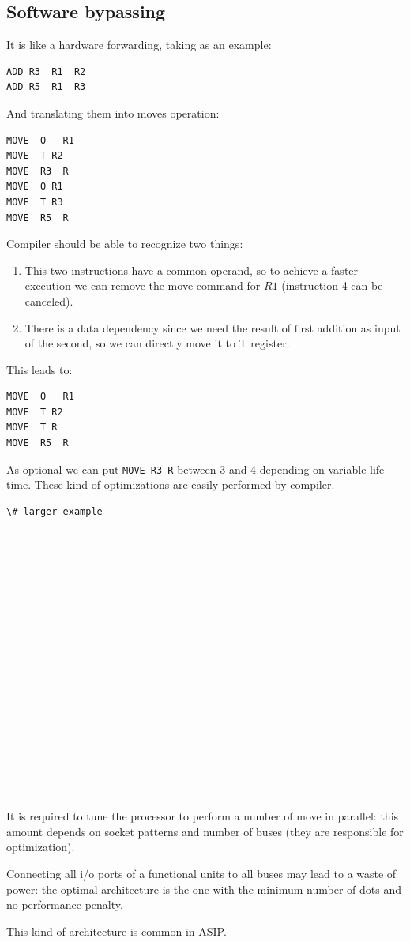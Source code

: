 \subsection{Software bypassing}
It is like a hardware forwarding, taking as an example:
\begin{verbatim}
ADD R3  R1  R2
ADD R5  R1  R3
\end{verbatim}
And translating them into moves operation:
\begin{verbatim}
MOVE  O   R1
MOVE  T R2
MOVE  R3  R
MOVE  O R1
MOVE  T R3
MOVE  R5  R
\end{verbatim}
Compiler should be able to recognize two things:
\begin{enumerate}
  \item This two instructions have a common operand, so to achieve a faster
    execution we can remove the move command for $R1$ (instruction 4 can be
    canceled).
  \item There is a data dependency since we need the result of first addition
    as input of the second, so we can directly move it to T register.
\end{enumerate}
This leads to:
\begin{verbatim}
MOVE  O   R1
MOVE  T R2
MOVE  T R
MOVE  R5  R
\end{verbatim}
As optional we can put \verb|MOVE R3 R| between 3 and 4 depending on variable
life time. These kind of optimizations are easily performed by compiler.
\begin{verbatim}
\# larger example



















\end{verbatim}

It is required to tune the processor to perform a number of move in parallel:
this amount depends on socket patterns and number of buses (they are
responsible for optimization).

Connecting all i/o ports of a functional units to all buses may lead to a waste
of power: the optimal architecture is the one with the minimum number of dots
and no performance penalty.

This kind of architecture is common in ASIP.

